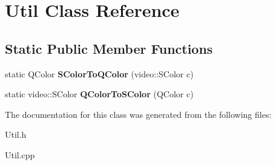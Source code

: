 \hypertarget{class_util}{\section{Util Class Reference}
\label{class_util}
}
\subsection*{Static Public Member Functions}
\begin{DoxyCompactItemize}
\item 
\hypertarget{class_util_aa6b5f7ff33a0b4cadb0794461cb795d0}{static Q\-Color {\bfseries S\-Color\-To\-Q\-Color} (video\-::\-S\-Color c)}\label{class_util_aa6b5f7ff33a0b4cadb0794461cb795d0}

\item 
\hypertarget{class_util_af3dfd6bf03e3b9d7b950e964eb230287}{static video\-::\-S\-Color {\bfseries Q\-Color\-To\-S\-Color} (Q\-Color c)}\label{class_util_af3dfd6bf03e3b9d7b950e964eb230287}

\end{DoxyCompactItemize}


The documentation for this class was generated from the following files\-:\begin{DoxyCompactItemize}
\item 
Util.\-h\item 
Util.\-cpp\end{DoxyCompactItemize}
